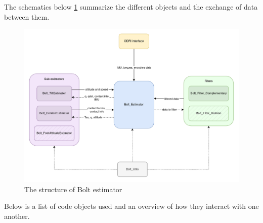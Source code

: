 \documentclass[a4paper,10pt]{article}
\begin{document}
The schematics below \ref{fig:estimator_global_architecture} summarize the different objects and the exchange of data between them.

\begin{figure}[H]

\centering
  \includegraphics[width=\linewidth, angle=0, scale=1.1]{./images/Structure_simple.png}
  \caption{The structure of Bolt estimator}
  
\label{fig:estimator_global_architecture}
\end{figure}

Below is a list of code objects used and an overview of how they interact with one another.
\end{document}
